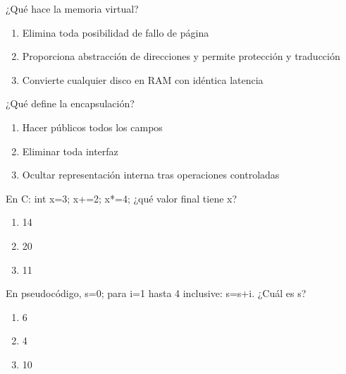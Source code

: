 \noindent\begin{minipage}{\linewidth}\setlength{\parskip}{4pt}\label{q:S-039}
¿Qué hace la memoria virtual?
\begin{enumerate}[label=\Alph*),nosep]
\item Elimina toda posibilidad de fallo de página
\item Proporciona abstracción de direcciones y permite protección y traducción
\item Convierte cualquier disco en RAM con idéntica latencia
\end{enumerate}\end{minipage}\par\medskip

\noindent\begin{minipage}{\linewidth}\setlength{\parskip}{4pt}\label{q:S-040}
¿Qué define la encapsulación?
\begin{enumerate}[label=\Alph*),nosep]
\item Hacer públicos todos los campos
\item Eliminar toda interfaz
\item Ocultar representación interna tras operaciones controladas
\end{enumerate}\end{minipage}\par\medskip

\noindent\begin{minipage}{\linewidth}\setlength{\parskip}{4pt}\label{q:S-041}
En C: int x=3; x+=2; x*=4; ¿qué valor final tiene x?
\begin{enumerate}[label=\Alph*),nosep]
\item 14
\item 20
\item 11
\end{enumerate}\end{minipage}\par\medskip

\noindent\begin{minipage}{\linewidth}\setlength{\parskip}{4pt}\label{q:S-042}
En pseudocódigo, s=0; para i=1 hasta 4 inclusive: s=s+i. ¿Cuál es s?
\begin{enumerate}[label=\Alph*),nosep]
\item 6
\item 4
\item 10
\end{enumerate}\end{minipage}\par\medskip

